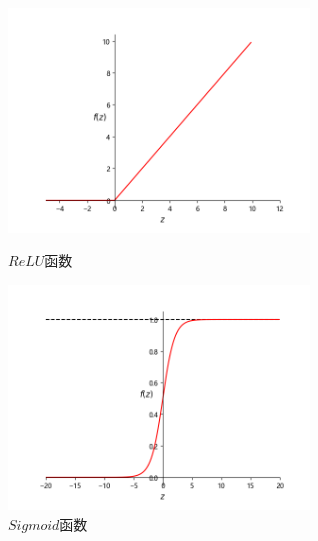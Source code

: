 \begin{figure}[htbp]
	\centering
	\begin{minipage}[t]{0.48\textwidth}
		\centering
		\includegraphics[width=8cm]{figures/chapter_2/fig_2_2.png}
		\caption{$ReLU$函数}\label{sec:fig_2_2}
	\end{minipage}
	\begin{minipage}[t]{0.48\textwidth}
		\centering
		\includegraphics[width=8cm]{figures/chapter_2/fig_2_3.png}
	\end{minipage}
	\caption{$Sigmoid$函数}\label{sec:fig_2_3}
\end{figure}


